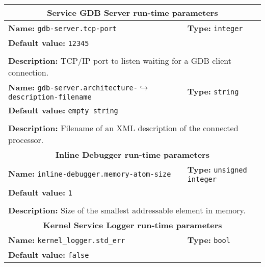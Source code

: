 \newpage
\begin{center}
	\begin{tabular}{|p{7.5cm}|p{7.5cm}|}
	\hline
	\multicolumn{2}{|c|}{\textbf{\large Service GDB Server run-time parameters}}\\
	\hline
	\multicolumn{1}{|p{7.5cm}}{\textbf{Name:} \texttt{gdb-server.tcp-port}} & \multicolumn{1}{p{7.5cm}|}{\textbf{Type:} \texttt{integer}}\\
	\multicolumn{2}{|p{15cm}|}{\textbf{Default value:} \texttt{12345}}\\
	\multicolumn{2}{|l|}{}\\
	\multicolumn{2}{|p{15cm}|}{\textbf{Description:} \newline TCP/IP port to listen waiting for a GDB client connection.}\\
	\hline
	\multicolumn{1}{|p{7.5cm}}{\textbf{Name:} \texttt{gdb-server.architecture-}\newline$\hookrightarrow$\texttt{description-filename}} & \multicolumn{1}{p{7.5cm}|}{\textbf{Type:} \texttt{string}}\\
	\multicolumn{2}{|p{15cm}|}{\textbf{Default value:} \texttt{empty string}}\\
	\multicolumn{2}{|l|}{}\\
	\multicolumn{2}{|p{15cm}|}{\textbf{Description:} \newline Filename of an XML description of the connected processor.}\\
	\hline
	\hline
	\multicolumn{2}{|c|}{\textbf{\large Inline Debugger run-time parameters}}\\
	\hline
	\multicolumn{1}{|p{7.5cm}}{\textbf{Name:} \texttt{inline-debugger.memory-atom-size}} & \multicolumn{1}{p{7.5cm}|}{\textbf{Type:} \texttt{unsigned integer}}\\
	\multicolumn{2}{|p{15cm}|}{\textbf{Default value:} \texttt{1}}\\
	\multicolumn{2}{|l|}{}\\
	\multicolumn{2}{|p{15cm}|}{\textbf{Description:} \newline Size of the smallest addressable element in memory.}\\
	\hline
	\multicolumn{2}{|c|}{\textbf{\large Kernel Service Logger run-time parameters}}\\
	\hline
	\multicolumn{1}{|p{7.5cm}}{\textbf{Name:} \texttt{kernel\_logger.std\_err}} & \multicolumn{1}{p{7.5cm}|}{\textbf{Type:} \texttt{bool}}\\
	\multicolumn{2}{|p{15cm}|}{\textbf{Default value:} \texttt{false}}\\

\end{tabular}
\end{center}
